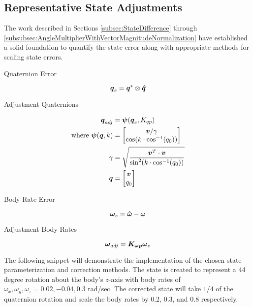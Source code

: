 \subsection{Representative State Adjustments}
\label{subsec:RepresentativeStateAdjustments}

The work described in Sections \ref{subsec:StateDifference} through \ref{subsubsec:AngleMultiplierWithVectorMagnitudeNormalization} have established a solid foundation to quantify the state error along with appropriate methods for scaling state errors.

Quaternion Error

\begin{equation}
  \boldsymbol{q}_e = \boldsymbol{q}^* \otimes \boldsymbol{\hat{q}}
\end{equation}

Adjustment Quaternions

\begin{equation}
  \begin{aligned}
    \boldsymbol{q}_{adj} &= \boldsymbol{\psi}(\boldsymbol{q}_e, K_{qp}) \\
    \text{where } \boldsymbol{\psi}(\boldsymbol{q}, k) &= \begin{bmatrix} \boldsymbol{v} / \gamma \\ \cos ( k \cdot \cos^{-1} (q_0))  \end{bmatrix} \\
    \gamma &= \sqrt{\frac{\boldsymbol{v}^T \cdot \boldsymbol{v}}{\sin^2 ( k \cdot \cos^{-1} (q_0))}} \\
    \boldsymbol{q} &= \begin{bmatrix} \boldsymbol{v} \\ q_0  \end{bmatrix}
  \end{aligned}
\end{equation}

Body Rate Error

\begin{equation}
  \boldsymbol{\omega}_e = \boldsymbol{\hat{\omega}} - \boldsymbol{\omega}
\end{equation}

Adjustment Body Rates

\begin{equation}
  \boldsymbol{\omega}_{adj} = \boldsymbol{K_{\omega p}} \boldsymbol{\omega}_e
\end{equation}

The following snippet will demonstrate the implementation of the chosen state parameterization and correction methods.  The state is created to represent a 44 degree rotation about the body's $z$-axis with body rates of $\omega_x, \omega_y, \omega_z = 0.02, -0.04, 0.3$ rad/sec.  The corrected state will take $1/4$ of the quaternion rotation and scale the body rates by 0.2, 0.3, and 0.8 respectively.

